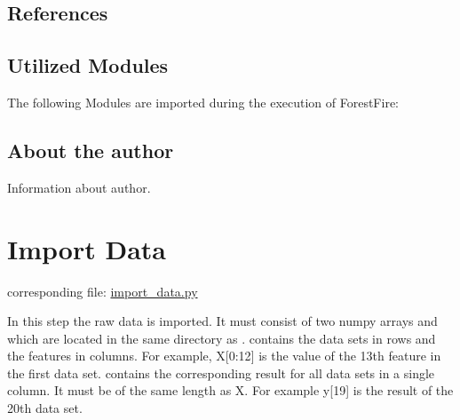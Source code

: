 \documentclass[letterpaper,10pt,english]{sphinxmanual}
\begin{document}
\subsection{References}
\label{\detokenize{Overview:references}}

\subsection{Utilized Modules}
\label{\detokenize{Overview:utilized-modules}}
The following Modules are imported during the execution of ForestFire:

\begin{sphinxVerbatim}[commandchars=\\\{\}]
   
   

   
    
\end{sphinxVerbatim}


\subsection{About the author}
\label{\detokenize{Overview:about-the-author}}
Information about author.
\label{\detokenize{Overview:blank}}\begin{figure}[htbp]
\centering

\noindent{}
\label{\detokenize{Overview:blank}}\end{figure}


\section{Import Data}
\label{\detokenize{Importing_Data:import-data}}\label{\detokenize{Importing_Data::doc}}\label{\detokenize{Importing_Data:id1}}
corresponding file: \href{https://github.com/weinertmos/ForestFire/blob/master/source/ForestFire/import\_data.py}{import\_data.py}

In this step the raw data is imported.
It must consist of two numpy arrays  and  which are located in the same directory as .
 contains the data sets in rows and the features in columns.
For example, X{[}0:12{]} is the value of the 13th feature in the first data set.
 contains the corresponding result for all data sets in a single column.
It must be of the same length as X.
For example y{[}19{]} is the result of the 20th data set.
\end{document}
